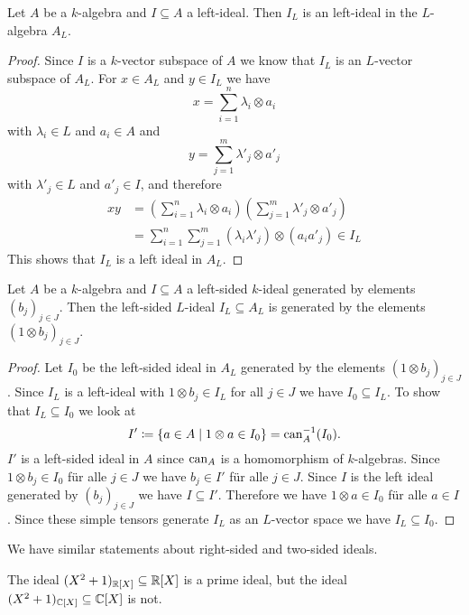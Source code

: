 \begin{lem}
 Let $A$ be a $k$-algebra and $I \subseteq A$ a left-ideal. Then $I_L$ is an left-ideal in the $L$-algebra $A_L$.
\end{lem}
\begin{proof}
 Since $I$ is a $k$-vector subspace of $A$ we know that $I_L$ is an $L$-vector subspace of $A_L$. For $x \in A_L$ and $y \in I_L$ we have
 \[
  x = \sum_{i=1}^n \lambda_i \otimes a_i
 \]
 with $\lambda_i \in L$ and $a_i \in A$ and
 \[
  y = \sum_{j=1}^m \lambda'_j \otimes a'_j
 \]
 with $\lambda'_j \in L$ and $a'_j \in I$, and therefore
 \begin{align*}
  xy
  &= \left( \sum_{i=1}^n \lambda_i \otimes a_i \right) \left( \sum_{j=1}^m \lambda'_j \otimes a'_j \right) \\
  &= \sum_{i=1}^n \sum_{j=1}^m (\lambda_i \lambda'_j) \otimes (a_i a'_j)
  \in I_L
 \end{align*}
 This shows that $I_L$ is a left ideal in $A_L$.
\end{proof}


\begin{lem}
 Let $A$ be a $k$-algebra and $I \subseteq A$ a left-sided $k$-ideal generated by elements $(b_j)_{j \in J}$. Then the left-sided $L$-ideal $I_L \subseteq A_L$ is generated by the elements $(1 \otimes b_j)_{j \in J}$.
\end{lem}
\begin{proof}
 Let $I_0$ be the left-sided ideal in $A_L$ generated by the elements $(1 \otimes b_j)_{j \in J}$. Since $I_L$ is a left-ideal with $1 \otimes b_j \in I_L$ for all $j \in J$ we have $I_0 \subseteq I_L$. To show that $I_L \subseteq I_0$ we look at
 \[
  I' \coloneqq \{a \in A \mid 1 \otimes a \in I_0\} = \operatorname{can}_A^{-1}(I_0).
 \]
 $I'$ is a left-sided ideal in $A$ since $\operatorname{can}_A$ is a homomorphism of $k$-algebras. Since $1 \otimes b_j \in I_0$ für alle $j \in J$ we have $b_j \in I'$ für alle $j \in J$. Since $I$ is the left ideal generated by $(b_j)_{j \in J}$ we have $I \subseteq I'$. Therefore we have $1 \otimes a \in I_0$ für alle $a \in I$. Since these simple tensors generate $I_L$ as an $L$-vector space we have $I_L \subseteq I_0$.
\end{proof}


\begin{rem}
 We have similar statements about right-sided and two-sided ideals.
\end{rem}


\begin{warn}
 The ideal $(X^2+1)_{\mathbb{R}[X]} \subseteq \mathbb{R}[X]$ is a prime ideal, but the ideal \mbox{$(X^2+1)_{\mathbb{C}[X]} \subseteq \mathbb{C}[X]$} is not.
\end{warn}






